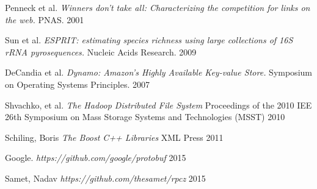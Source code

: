 \documentclass[11pt]{article}
\begin{document}
\begin{thebibliography}{99}
  Penneck et al.
  \emph{Winners don't take all: Characterizing the competition for links on the web.}
  PNAS.
  2001

  Sun et al.
  \emph{ESPRIT: estimating species richness using large collections of 16S rRNA pyrosequences.}
  Nucleic Acids Research.
  2009


  DeCandia et al.
  \emph{Dynamo: Amazon’s Highly Available Key-value Store.}
  Symposium on Operating Systems Principles.
  2007

Shvachko, et al.
\emph{The Hadoop Distributed File System}
Proceedings of the 2010 IEE 26th Symposium on Mass Storage Systems and Technologies (MSST)
2010

Schiling, Boris
\emph{The Boost C++ Libraries}
XML Press
2011

Google.
\emph{https://github.com/google/protobuf}
2015

Samet, Nadav
\emph{https://github.com/thesamet/rpcz}
2015

\end{thebibliography}
\end{document}
